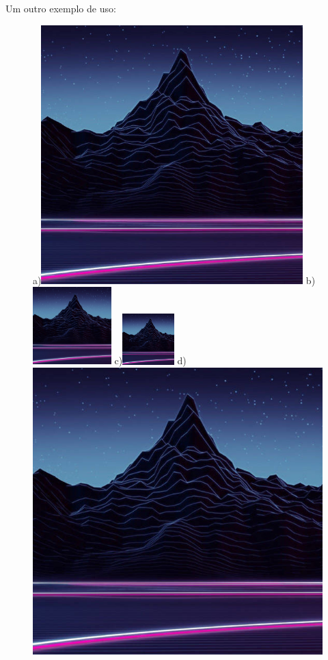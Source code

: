 \documentclass{report}
\begin{document}
            Um outro exemplo de uso:
            \begin{figure}[h]
                \center%
                    a)\includegraphics[height=10cm]{test}
                    b)\includegraphics[height=3cm]{test}
                    c)\includegraphics[width=20mm]{test}
                    d)\includegraphics[scale=.5,angle=90]{test}

\end{figure}
\end{document}
